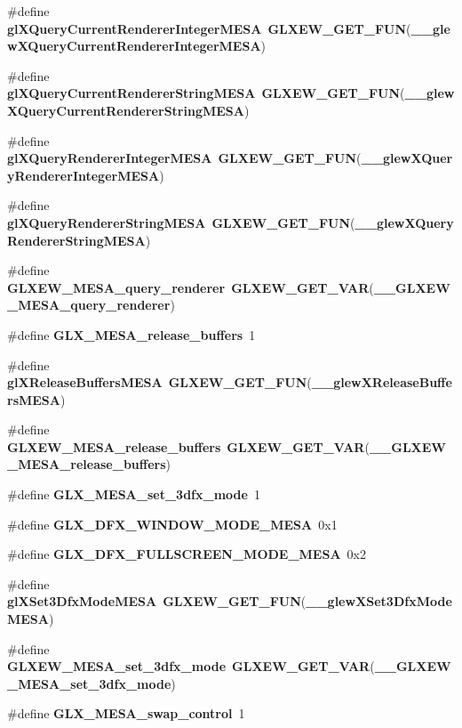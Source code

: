 \begin{DoxyCompactItemize}
\#define {\bf gl\+X\+Query\+Current\+Renderer\+Integer\+M\+E\+SA}~{\bf G\+L\+X\+E\+W\+\_\+\+G\+E\+T\+\_\+\+F\+UN}({\bf \+\_\+\+\_\+glew\+X\+Query\+Current\+Renderer\+Integer\+M\+E\+SA})
\item 
\#define {\bf gl\+X\+Query\+Current\+Renderer\+String\+M\+E\+SA}~{\bf G\+L\+X\+E\+W\+\_\+\+G\+E\+T\+\_\+\+F\+UN}({\bf \+\_\+\+\_\+glew\+X\+Query\+Current\+Renderer\+String\+M\+E\+SA})
\item 
\#define {\bf gl\+X\+Query\+Renderer\+Integer\+M\+E\+SA}~{\bf G\+L\+X\+E\+W\+\_\+\+G\+E\+T\+\_\+\+F\+UN}({\bf \+\_\+\+\_\+glew\+X\+Query\+Renderer\+Integer\+M\+E\+SA})
\item 
\#define {\bf gl\+X\+Query\+Renderer\+String\+M\+E\+SA}~{\bf G\+L\+X\+E\+W\+\_\+\+G\+E\+T\+\_\+\+F\+UN}({\bf \+\_\+\+\_\+glew\+X\+Query\+Renderer\+String\+M\+E\+SA})
\item 
\#define {\bf G\+L\+X\+E\+W\+\_\+\+M\+E\+S\+A\+\_\+query\+\_\+renderer}~{\bf G\+L\+X\+E\+W\+\_\+\+G\+E\+T\+\_\+\+V\+AR}({\bf \+\_\+\+\_\+\+G\+L\+X\+E\+W\+\_\+\+M\+E\+S\+A\+\_\+query\+\_\+renderer})
\item 
\#define {\bf G\+L\+X\+\_\+\+M\+E\+S\+A\+\_\+release\+\_\+buffers}~1
\item 
\#define {\bf gl\+X\+Release\+Buffers\+M\+E\+SA}~{\bf G\+L\+X\+E\+W\+\_\+\+G\+E\+T\+\_\+\+F\+UN}({\bf \+\_\+\+\_\+glew\+X\+Release\+Buffers\+M\+E\+SA})
\item 
\#define {\bf G\+L\+X\+E\+W\+\_\+\+M\+E\+S\+A\+\_\+release\+\_\+buffers}~{\bf G\+L\+X\+E\+W\+\_\+\+G\+E\+T\+\_\+\+V\+AR}({\bf \+\_\+\+\_\+\+G\+L\+X\+E\+W\+\_\+\+M\+E\+S\+A\+\_\+release\+\_\+buffers})
\item 
\#define {\bf G\+L\+X\+\_\+\+M\+E\+S\+A\+\_\+set\+\_\+3dfx\+\_\+mode}~1
\item 
\#define {\bf G\+L\+X\+\_\+D\+F\+X\+\_\+\+W\+I\+N\+D\+O\+W\+\_\+\+M\+O\+D\+E\+\_\+\+M\+E\+SA}~0x1
\item 
\#define {\bf G\+L\+X\+\_\+D\+F\+X\+\_\+\+F\+U\+L\+L\+S\+C\+R\+E\+E\+N\+\_\+\+M\+O\+D\+E\+\_\+\+M\+E\+SA}~0x2
\item 
\#define {\bf gl\+X\+Set3\+Dfx\+Mode\+M\+E\+SA}~{\bf G\+L\+X\+E\+W\+\_\+\+G\+E\+T\+\_\+\+F\+UN}({\bf \+\_\+\+\_\+glew\+X\+Set3\+Dfx\+Mode\+M\+E\+SA})
\item 
\#define {\bf G\+L\+X\+E\+W\+\_\+\+M\+E\+S\+A\+\_\+set\+\_\+3dfx\+\_\+mode}~{\bf G\+L\+X\+E\+W\+\_\+\+G\+E\+T\+\_\+\+V\+AR}({\bf \+\_\+\+\_\+\+G\+L\+X\+E\+W\+\_\+\+M\+E\+S\+A\+\_\+set\+\_\+3dfx\+\_\+mode})
\item 
\#define {\bf G\+L\+X\+\_\+\+M\+E\+S\+A\+\_\+swap\+\_\+control}~1

\end{DoxyCompactItemize}
